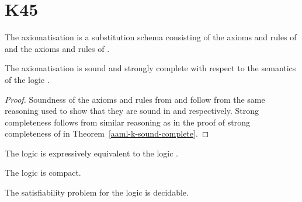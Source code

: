 \section{K45}

\begin{definition}
The axiomatisation \axiomAamlKFF{} is a substitution schema consisting of the axioms and rules of \axiomAmlKFF{} and the axioms and rules of \axiomRmlKFF{}.
\end{definition}

\begin{theorem}
The axiomatisation \axiomRmlKFF{} is sound and strongly complete with respect to the semantics of the logic \logicAamlKFF{}.
\end{theorem}

\begin{proof}
Soundness of the axioms and rules from \axiomAmlKFF{} and \axiomRmlKFF{} follow from the same reasoning used to show that they are sound in \logicAmlKFF{} and \logicRmlKFF{} respectively.
Strong completeness follows from similar reasoning as in the proof of strong completeness of \axiomAamlK{} in Theorem~\ref{aaml-k-sound-complete}.
\end{proof}

\begin{corollary}
The logic \logicAamlKFF{} is expressively equivalent to the logic \logicKFF{}.
\end{corollary}

\begin{corollary}
The logic \logicAamlKFF{} is compact.
\end{corollary}

\begin{corollary}
The satisfiability problem for the logic \logicAamlKFF{} is decidable.
\end{corollary}
